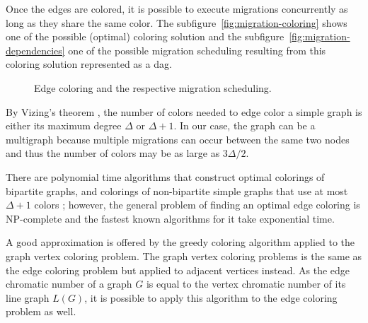 Once the edges are colored, it is possible to execute migrations concurrently as long as they share the same color. The subfigure~\ref{fig:migration-coloring} shows one of the possible (optimal) coloring solution and the subfigure~\ref{fig:migration-dependencies} one of the possible migration scheduling resulting from this coloring solution represented as a \gls{dag}.


\begin{figure}[h]
	\hfill
	\caption{Edge coloring and the respective migration scheduling.}
	\label{fig:migration-process}
\end{figure}

By Vizing's theorem \cite{vizing}, the number of colors needed to edge color a simple graph is either its maximum degree $\Delta$ or $\Delta+1$. In our case, the graph can be a multigraph because multiple migrations can occur between the same two nodes and thus the number of colors may be as large as $3\Delta/2$.

There are polynomial time algorithms that construct optimal colorings of bipartite graphs, and colorings of non-bipartite simple graphs that use at most $\Delta+1$ colors \cite{bipartite}; however, the general problem of finding an optimal edge coloring is NP-complete and the fastest known algorithms for it take exponential time.

A good approximation is offered by the greedy coloring algorithm applied to the graph vertex coloring problem. The graph vertex coloring problems is the same as the edge coloring problem but applied to adjacent vertices instead. As the edge chromatic number of a graph $G$ is equal to the vertex chromatic number of its line graph $L(G)$, it is possible to apply this algorithm to the edge coloring problem as well.

